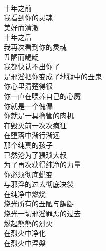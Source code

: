 \begin{poem}[在纯净中燃烧]
    \begin{multicols}{3}
        \centering~\\
        十年之前 \\ 我看到你的灵魂 \\ 美好而清澈 \\ 十年之后 \\ 我再次看到你的灵魂 \\ 丑陋而龌龊 \\ 我都快认不出你了 \\ 是邪淫把你变成了地狱中的丑鬼 \\ 你心里清楚得很 \\ 你一直在喂养自己的心魔 \\ 你就是一个傀儡 \\ 你就是一具撸管的肉机 \\ 在毁灭前一次次疯狂 \\ 在堕落中渐行渐远 \\ 那个纯真的孩子 \\ 已然沦为了猥琐大叔 \\ 为了再次获得纯净的力量 \\ 你必须彻底蜕变 \\ 与邪淫的过去彻底决裂 \\ 在纯净中燃烧 \\ 烧光所有的丑陋与龌龊 \\ 烧光一切邪淫罪恶的过去 \\ 燃起熊熊的烈火 \\ 在烈火中净化 \\ 在烈火中涅槃
    \end{multicols}
\end{poem}

